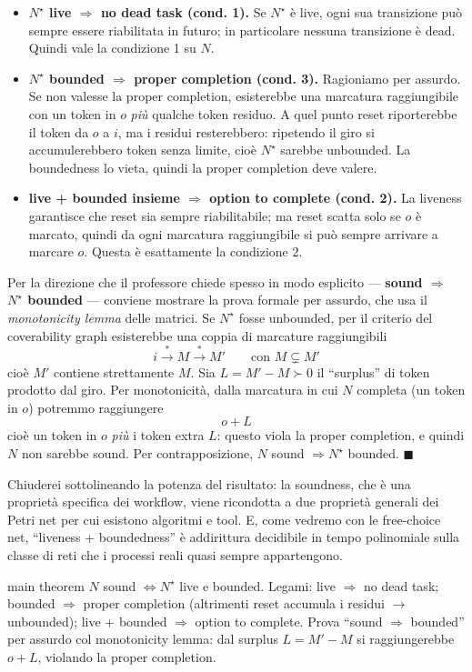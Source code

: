 \begin{itemize}
  \item \textbf{$N^\star$ live $\Rightarrow$ no dead task (cond. 1).} Se $N^\star$ è live, ogni sua transizione può sempre essere riabilitata in futuro; in particolare nessuna transizione è dead. Quindi vale la condizione 1 su $N$.
  \item \textbf{$N^\star$ bounded $\Rightarrow$ proper completion (cond. 3).} Ragioniamo per assurdo. Se non valesse la proper completion, esisterebbe una marcatura raggiungibile con un token in $o$ \emph{più} qualche token residuo. A quel punto reset riporterebbe il token da $o$ a $i$, ma i residui resterebbero: ripetendo il giro si accumulerebbero token senza limite, cioè $N^\star$ sarebbe unbounded. La boundedness lo vieta, quindi la proper completion deve valere.
  \item \textbf{live + bounded insieme $\Rightarrow$ option to complete (cond. 2).} La liveness garantisce che reset sia sempre riabilitabile; ma reset scatta solo se $o$ è marcato, quindi da ogni marcatura raggiungibile si può sempre arrivare a marcare $o$. Questa è esattamente la condizione 2.
\end{itemize}

Per la direzione che il professore chiede spesso in modo esplicito — \textbf{sound $\Rightarrow$ $N^\star$ bounded} — conviene mostrare la prova formale per assurdo, che usa il \emph{monotonicity lemma} delle matrici. Se $N^\star$ fosse unbounded, per il criterio del coverability graph esisterebbe una coppia di marcature raggiungibili
$$i \xrightarrow{\ast} M \xrightarrow{\ast} M' \qquad \text{con } M \subsetneq M'$$
cioè $M'$ contiene strettamente $M$. Sia $L = M' - M \succ 0$ il ``surplus'' di token prodotto dal giro. Per monotonicità, dalla marcatura in cui $N$ completa (un token in $o$) potremmo raggiungere
$$o + L$$
cioè un token in $o$ \emph{più} i token extra $L$: questo viola la proper completion, e quindi $N$ non sarebbe sound. Per contrapposizione, $N$ sound $\Rightarrow N^\star$ bounded. $\blacksquare$

Chiuderei sottolineando la potenza del risultato: la soundness, che è una proprietà specifica dei workflow, viene ricondotta a due proprietà generali dei Petri net per cui esistono algoritmi e tool. E, come vedremo con le free-choice net, ``liveness + boundedness'' è addirittura decidibile in tempo polinomiale sulla classe di reti che i processi reali quasi sempre appartengono.

\begin{puntochiave}{main theorem}
$N$ sound $\iff N^\star$ live e bounded. Legami: live $\Rightarrow$ no dead task; bounded $\Rightarrow$ proper completion (altrimenti reset accumula i residui $\to$ unbounded); live + bounded $\Rightarrow$ option to complete. Prova ``sound $\Rightarrow$ bounded'' per assurdo col monotonicity lemma: dal surplus $L=M'-M$ si raggiungerebbe $o+L$, violando la proper completion.
\end{puntochiave}

